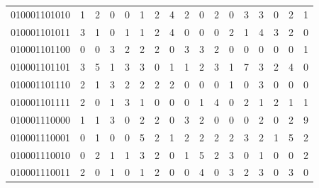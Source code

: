 \documentclass[10pt,a4paper]{article}
\begin{document}
\begin{longtable}{ |c|c|c|c|c|c|c|c|c|c|c|c|c|c|c|c|c| }
    010001101010              & 1                            & 2                                & 0                            & 0                              & 1   & 2   & 4   & 2   & 0   & 2   & 0   & 3   & 3   & 0   & 2   & 1   \\
    010001101011              & 3                            & 1                                & 0                            & 1                              & 1   & 2   & 4   & 0   & 0   & 0   & 2   & 1   & 4   & 3   & 2   & 0   \\
    010001101100              & 0                            & 0                                & 3                            & 2                              & 2   & 2   & 0   & 3   & 3   & 2   & 0   & 0   & 0   & 0   & 0   & 1   \\
    010001101101              & 3                            & 5                                & 1                            & 3                              & 3   & 0   & 1   & 1   & 2   & 3   & 1   & 7   & 3   & 2   & 4   & 0   \\
    010001101110              & 2                            & 1                                & 3                            & 2                              & 2   & 2   & 2   & 0   & 0   & 0   & 1   & 0   & 3   & 0   & 0   & 0   \\
    010001101111              & 2                            & 0                                & 1                            & 3                              & 1   & 0   & 0   & 0   & 1   & 4   & 0   & 2   & 1   & 2   & 1   & 1   \\
    010001110000              & 1                            & 1                                & 3                            & 0                              & 2   & 2   & 0   & 3   & 2   & 0   & 0   & 0   & 2   & 0   & 2   & 9   \\
    010001110001              & 0                            & 1                                & 0                            & 0                              & 5   & 2   & 1   & 2   & 2   & 2   & 2   & 3   & 2   & 1   & 5   & 2   \\
    010001110010              & 0                            & 2                                & 1                            & 1                              & 3   & 2   & 0   & 1   & 5   & 2   & 3   & 0   & 1   & 0   & 0   & 2   \\
    010001110011              & 2                            & 0                                & 1                            & 0                              & 1   & 2   & 0   & 0   & 4   & 0   & 3   & 2   & 3   & 0   & 3   & 0   \\

\end{longtable}
\end{document}
